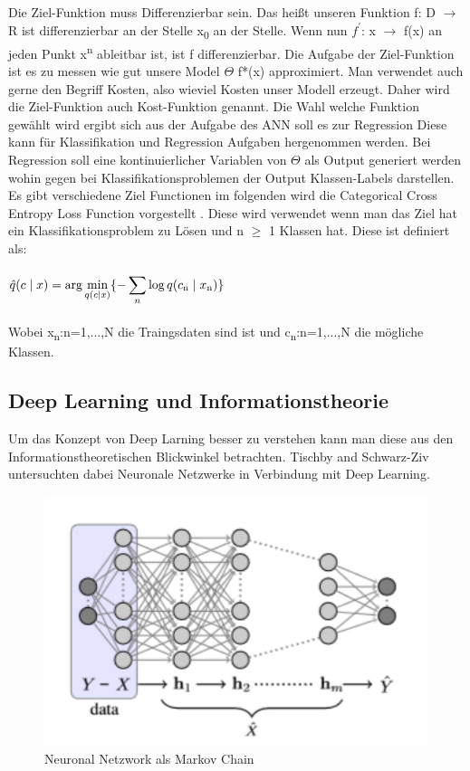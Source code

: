 \documentclass{llncs}
\begin{document}
Die Ziel-Funktion muss Differenzierbar sein. Das heißt unseren Funktion f: D $\to$ R ist differenzierbar an der Stelle x\textsubscript{0} an der Stelle. Wenn nun $f^\prime$: x $\to$ f(x) an jeden Punkt x\textsuperscript{n} ableitbar ist, ist f differenzierbar. Die Aufgabe der Ziel-Funktion ist es zu messen wie gut unsere Model $\Theta$ f*(x) approximiert. Man verwendet auch gerne den Begriff Kosten, also wieviel Kosten unser Modell erzeugt. Daher wird die Ziel-Funktion auch Kost-Funktion genannt. Die Wahl welche Funktion gewählt wird ergibt sich aus der Aufgabe des ANN soll es zur Regression Diese kann für Klassifikation und Regression Aufgaben hergenommen werden.   Bei Regression soll eine kontinuierlicher Variablen von $\Theta$ als Output generiert werden wohin gegen bei Klassifikationsproblemen der Output Klassen-Labels darstellen. Es gibt verschiedene Ziel Functionen im folgenden wird die Categorical Cross Entropy Loss Function vorgestellt \cite{crossentropy}. Diese wird verwendet wenn man das Ziel hat ein Klassifikationsproblem zu Lösen und n $\geq$ 1 Klassen hat. Diese ist definiert als:
\\\\
\begin{math}
\hat{q}(c\mid x)=\displaystyle\arg\min_{q(c\mid  x)}\{-\displaystyle\sum_{n}{\log q(c\textsubscript{n}\mid x\textsubscript{n})}\}
\end{math}
\\\\
Wobei  x\textsubscript{n}:n=1,...,N die Traingsdaten sind ist und c\textsubscript{n}:n=1,...,N die mögliche Klassen.
\newpage
\subsection{Deep Learning und Informationstheorie}
Um das Konzept von Deep Larning besser zu verstehen kann man diese aus den Informationstheoretischen Blickwinkel betrachten. Tischby and Schwarz-Ziv  \cite{infoth} untersuchten dabei Neuronale Netzwerke in Verbindung mit Deep Learning. 

\begin{figure}[htbp] 
	\centering
	\includegraphics[width=1.0\textwidth]{markovdeep.png}
	\caption{Neuronal Netzwork als Markov Chain}
	\label{fig:Bild1}
\end{figure}
\end{document}
